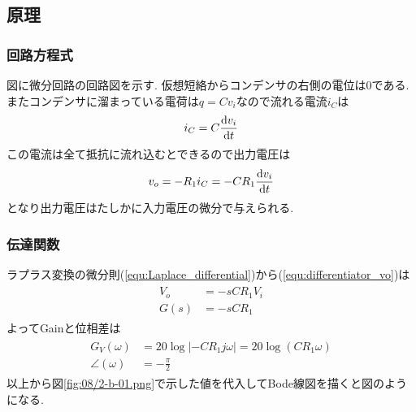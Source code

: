 \subsection{原理}
\subsubsection{回路方程式}
図に微分回路の回路図を示す.
仮想短絡からコンデンサの右側の電位は0である.
またコンデンサに溜まっている電荷は$q=Cv_i$なので流れる電流$i_C$は
\begin{align}
  i_C=C\frac{{\rm d}v_i}{{\rm d}t}
\end{align}
この電流は全て抵抗に流れ込むとできるので出力電圧は
\begin{align}
  \label{equ:differentiator_vo}
  v_o=-R_1i_C=-CR_1\frac{{\rm d}v_i}{{\rm d}t}
\end{align}
となり出力電圧はたしかに入力電圧の微分で与えられる.
\subsubsection{伝達関数}
ラプラス変換の微分則(\ref{equ:Laplace_differential})から(\ref{equ:differentiator_vo})は
\begin{align}
  \begin{split}
    V_o&=-sCR_1V_i\\
    G(s)&=-sCR_1
  \end{split}
\end{align}
よってGainと位相差は
\begin{align}
  \begin{split}
    G_V(\omega)&=20\log\left|-CR_1j\omega\right|=20\log(CR_1\omega)\\
    \angle(\omega)&=-\frac{\pi}{2}
  \end{split}
\end{align}
以上から図\ref{fig:08/2-b-01.png}で示した値を代入してBode線図を描くと図のようになる.
